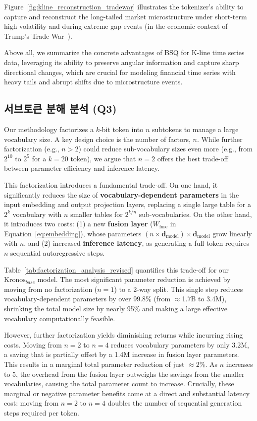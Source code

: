 Figure~\ref{fig:kline_reconstruction_tradewar} illustrates the tokenizer's ability to capture and reconstruct the long-tailed market microstructure under short-term high volatility and during extreme gap events (in the economic context of Trump’s Trade War~\cite{mckibbin2025global}).

Above all, we summarize the concrete advantages of BSQ for K-line time series data, leveraging its ability to preserve angular information and capture sharp directional changes, which are crucial for modeling financial time series with heavy tails and abrupt shifts due to microstructure events.

\subsection{서브토큰 분해 분석 (Q3)}
\label{sec:subtoken_factorization}

Our methodology factorizes a $k$-bit token into $n$ subtokens to manage a large vocabulary size. A key design choice is the number of factors, $n$. While further factorization (e.g., $n>2$) could reduce sub-vocabulary sizes even more (e.g., from $2^{10}$ to $2^5$ for a $k=20$ token), we argue that $n=2$ offers the best trade-off between parameter efficiency and inference latency.

This factorization introduces a fundamental trade-off. On one hand, it significantly reduces the size of \textbf{vocabulary-dependent parameters} in the input embedding and output projection layers, replacing a single large table for a $2^k$ vocabulary with $n$ smaller tables for $2^{k/n}$ sub-vocabularies. On the other hand, it introduces two costs: (1) a new \textbf{fusion layer} ($W_{\text{fuse}}$ in Equation~\ref{eq:embedding}), whose parameters $(n \times \mathbf{d}_{\text{model}}) \times \mathbf{d}_{\text{model}}$ grow linearly with $n$, and (2) increased \textbf{inference latency}, as generating a full token requires $n$ sequential autoregressive steps.

Table~\ref{tab:factorization_analysis_revised} quantifies this trade-off for our $\text{Kronos}_{base}$ model. The most significant parameter reduction is achieved by moving from no factorization ($n=1$) to a 2-way split. This single step reduces vocabulary-dependent parameters by over 99.8\% (from $\approx$1.7B to 3.4M), shrinking the total model size by nearly 95\% and making a large effective vocabulary computationally feasible.

However, further factorization yields diminishing returns while incurring rising costs. Moving from $n=2$ to $n=4$ reduces vocabulary parameters by only 3.2M, a saving that is partially offset by a 1.4M increase in fusion layer parameters. This results in a marginal total parameter reduction of just $\approx$2\%. As $n$ increases to 5, the overhead from the fusion layer outweighs the savings from the smaller vocabularies, causing the total parameter count to increase. Crucially, these marginal or negative parameter benefits come at a direct and substantial latency cost: moving from $n=2$ to $n=4$ doubles the number of sequential generation steps required per token.

